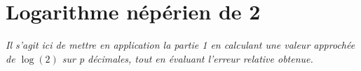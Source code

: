\documentclass{article}
\begin{document}

  




  
 



  




  
 



  



\section{Logarithme népérien de 2}
\label{sec:ln}
\textit{Il s'agit ici de mettre en application la partie 1 en calculant une valeur approchée de $\log(2)$ sur p d\'ecimales, tout en \'evaluant l'erreur relative obtenue.}
\vskip 1mm ~
\end{document}
